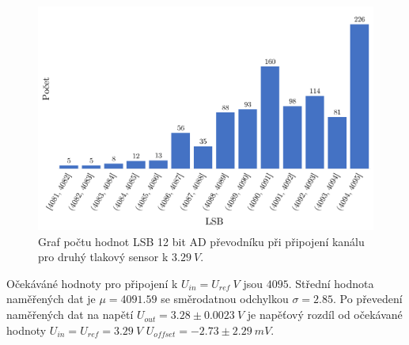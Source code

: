 \begin{figure}[H]
    \caption{Graf počtu hodnot LSB 12 bit AD převodníku při připojení kanálu pro druhý tlakový sensor k $3.29 \ V$.}
    \label{fig:hist_vacuum2_3_3}
    \includegraphics[width=1\textwidth]{graphs/vacuum2_33.png}

\end{figure}
Očekáváné hodnoty pro připojení k $U_{in} = U_{ref} \ V$ jsou $4095$. Střední hodnota naměřených dat je $\mu = 4091.59$ se směrodatnou odchylkou $\sigma = 2.85$. Po převedení naměřených dat na napětí $U_{out} = 3.28 \pm 0.0023 \ V$ je napěťový rozdíl od očekávané hodnoty $U_{in} = U_{ref} = 3.29 \ V$
$U_{offset} = -2.73 \pm 2.29 \ mV$.


